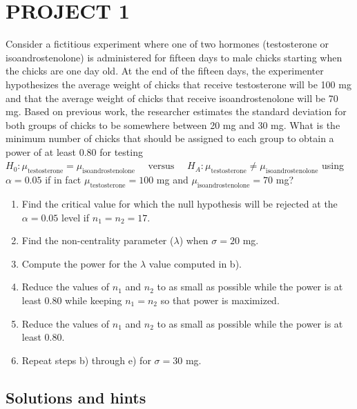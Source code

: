 \documentclass[
]{article}
\begin{document}
\hypertarget{project-1}{%
\section*{PROJECT 1}\label{project-1}}

Consider a fictitious experiment where one of two hormones (testosterone or isoandrostenolone) is administered for fifteen days to male chicks starting when the chicks are one day old. At the end of the fifteen days, the experimenter hypothesizes the average weight of chicks that receive testosterone will be 100 mg and that the average weight of chicks that receive isoandrostenolone will be 70 mg. Based on previous work, the researcher estimates the standard deviation for both groups of chicks to be somewhere between 20 mg and 30 mg. What is the minimum number of chicks that should be assigned to each group to obtain a power of at least 0.80 for testing \(H_0: \mu_\text{testosterone} = \mu_\text{isoandrostenolone}\quad\text{ versus }\quad H_A: \mu_\text{testosterone} \neq \mu_\text{isoandrostenolone}\) using \(\alpha = 0.05\) if in fact \(\mu_\text{testosterone} = 100\) mg and \(\mu_\text{isoandrostenolone} = 70\) mg?

\begin{enumerate}
\def\labelenumi{\alph{enumi})}
\item
  Find the critical value for which the null hypothesis will be rejected at the \(\alpha = 0.05\) level if \(n_1=n_2 = 17\).
\item
  Find the non-centrality parameter (\(\lambda\)) when \(\sigma = 20\) mg.
\item
  Compute the power for the \(\lambda\) value computed in b).
\item
  Reduce the values of \(n_1\) and \(n_2\) to as small as possible while the power is at least 0.80 while keeping \(n_1 = n_2\) so that power is maximized.
\item
  Reduce the values of \(n_1\) and \(n_2\) to as small as possible while the power is at least 0.80.
\item
  Repeat steps b) through e) for \(\sigma = 30\) mg.
\end{enumerate}

\hypertarget{solutions-and-hints}{%
\subsection*{Solutions and hints}\label{solutions-and-hints}}
\end{document}
